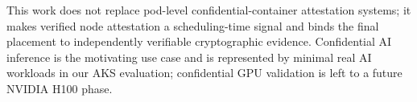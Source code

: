 This work does not replace pod-level confidential-container attestation systems;
it makes verified node attestation a scheduling-time signal and binds the final
placement to independently verifiable cryptographic evidence. Confidential AI
inference is the motivating use case and is represented by minimal real AI
workloads in our AKS evaluation; confidential GPU validation is left to a future
NVIDIA H100 phase.
